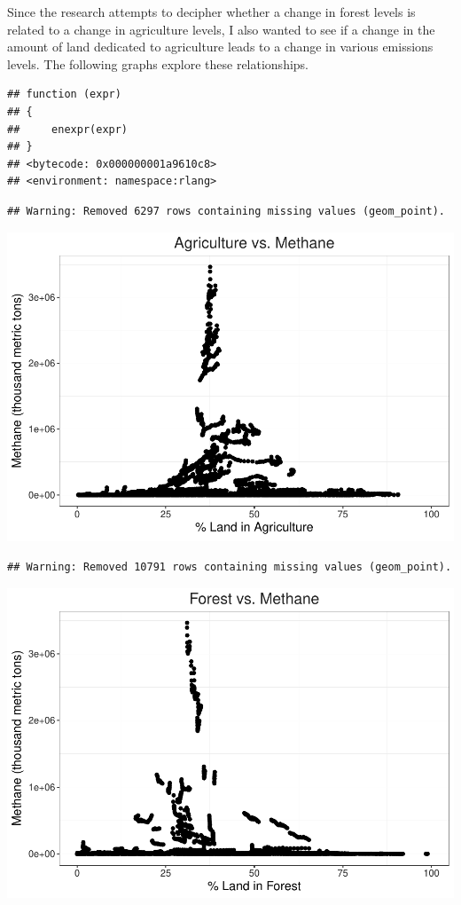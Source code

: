 \documentclass[12pt,]{article}
\begin{document}
Since the research attempts to decipher whether a change in forest
levels is related to a change in agriculture levels, I also wanted to
see if a change in the amount of land dedicated to agriculture leads to
a change in various emissions levels. The following graphs explore these
relationships.

\begin{verbatim}
## function (expr) 
## {
##     enexpr(expr)
## }
## <bytecode: 0x000000001a9610c8>
## <environment: namespace:rlang>
\end{verbatim}

\begin{verbatim}
## Warning: Removed 6297 rows containing missing values (geom_point).
\end{verbatim}

\includegraphics{Marx_ENV872_Project_files/figure-latex/unnamed-chunk-4-1.pdf}

\begin{verbatim}
## Warning: Removed 10791 rows containing missing values (geom_point).
\end{verbatim}

\includegraphics{Marx_ENV872_Project_files/figure-latex/unnamed-chunk-4-2.pdf}
\end{document}
